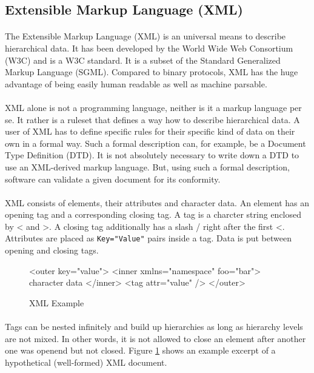 \subsection{Extensible Markup Language (XML)}
\paragraph{}
The Extensible Markup Language (XML) is an universal means to describe hierarchical data. It has been developed by the World Wide Web Consortium (W3C) and is a W3C standard. It is a subset of the Standard Generalized Markup Language (SGML). Compared to binary protocols, XML has the huge advantage of being easily human readable as well as machine parsable.

\paragraph{}
XML alone is not a programming language, neither is it a markup language per se. It rather is a ruleset that defines a way how to describe hierarchical data. A user of XML has to define specific rules for their specific kind of data on their own in a formal way. Such a formal description can, for example, be a Document Type Definition (DTD). It is not absolutely necessary to write down a DTD to use an XML-derived markup language. But, using such a formal description, software can validate a given document for its conformity.

\paragraph{}
XML consists of elements, their attributes and character data. An element has an opening tag and a corresponding closing tag. A tag is a charcter string enclosed by \glqq{}<\grqq{} and \glqq{}>\grqq{}. A closing tag additionally has a slash \glqq{}/\grqq{} right after the first \glqq{}<\grqq{}. Attributes are placed as \texttt{Key="Value"} pairs inside a tag. Data is put between opening and closing tags.

\begin{figure}[H]
\begin{listing}{1}
<outer key="value">
  <inner xmlns="namespace" foo="bar">
    character data
  </inner>
  <tag attr="value" />
</outer>
\end{listing}
\caption{XML Example}
\label{fig:XMLexample}
\end{figure}

\paragraph{}
Tags can be nested infinitely and build up hierarchies as long as hierarchy levels are not mixed. In other words, it is not allowed to close an element after another one was openend but not closed. Figure \ref{fig:XMLexample} shows an example excerpt of a hypothetical (well-formed) XML document.

